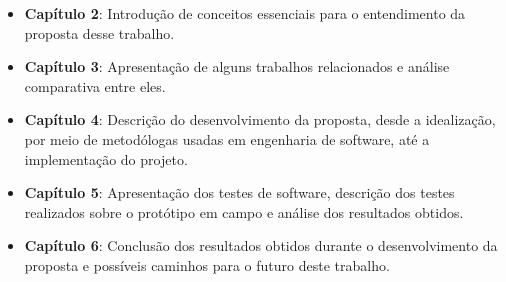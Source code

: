 \begin{itemize}
    \item \textbf{Capítulo 2}: Introdução de conceitos essenciais para o entendimento
    da proposta desse trabalho.
    
    \item \textbf{Capítulo 3}: Apresentação de alguns trabalhos relacionados
    e análise comparativa entre eles.
    
	\item \textbf{Capítulo 4}: Descrição do desenvolvimento da proposta, desde a
	idealização, por meio de metodólogas usadas em engenharia de software, até
	a implementação do projeto.
	
	\item \textbf{Capítulo 5}: Apresentação dos testes de software, descrição dos testes realizados sobre o protótipo em campo e análise dos resultados obtidos.
	
	\item \textbf{Capítulo 6}: Conclusão dos resultados obtidos durante o desenvolvimento
	da proposta e possíveis caminhos para o futuro deste trabalho.
	
\end{itemize}